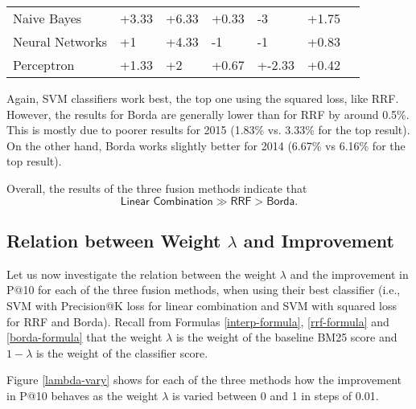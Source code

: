 \begin{table}[h!]
{\begin{tabular}{@{}lllllll@{}}
Naive Bayes                                              & +3.33           & +6.33              & +0.33           & -3                & +1.75          \\
Neural Networks                                         & +1              & +4.33              & -1             & -1                & +0.83          \\
Perceptron                                              & +1.33           & +2                 & +0.67           & +-2.33             & +0.42         \\\bottomrule
\end{tabular}%
}
\end{table}

Again, SVM classifiers work best, the top one using the squared loss, like RRF.
However, the results for Borda are generally lower than for RRF by around 0.5\%. This is mostly due
to poorer results for 2015 (1.83\% vs. 3.33\% for the top result).
On the other hand, Borda works slightly better for 2014 (6.67\% vs 6.16\% for the top result).

Overall, the results of the three fusion methods indicate that \[\textsf{Linear Combination} \gg \textsf{RRF} > \textsf{Borda}.\]

\subsection{Relation between Weight $\lambda$ and Improvement}
Let us now investigate the relation between the weight $\lambda$ and the improvement in P@10 for each of the three
fusion methods, when using their best classifier (i.e., SVM with Precision@K loss for linear combination
and SVM with squared loss for RRF and Borda).
Recall from Formulas \ref{interp-formula}, \ref{rrf-formula} and \ref{borda-formula} that the weight $\lambda$ is the
weight of the baseline BM25 score and $1-\lambda$ is the weight of the classifier score.

Figure \ref{lambda-vary} shows for each of the three methods
how the improvement in P@10 behaves as the weight $\lambda$ is varied between 0 and 1 in steps of 0.01.

